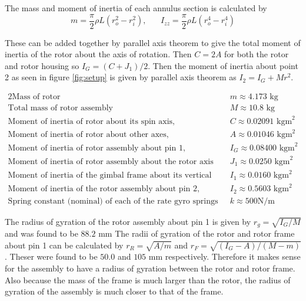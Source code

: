 \documentclass[8pt]{article}
\begin{document}
The mass and moment of inertia of each annulus section is calculated by
\begin{equation}
    m = \frac{\pi}{2} \rho L(r_o^2 - r_i^2), \;\;\;\;\;\; I_{zz} = \frac{\pi}{2} \rho L(r_o^4 - r_i^4)
\end{equation}

These can be added together by parallel axis theorem to give the total moment of inertia of the rotor about the axis of rotation.
Then $C = 2A$ for both the rotor and rotor housing so $I_G = (C + J_1)/2$.
Then the moment of inertia about point 2 as seen in figure \ref{fig:setup} is given by parallel axis theorem as $I_2 = I_G + Mr^2$.

\begin{alignat}{2}
    \text{Mass of rotor} \;\;\;\; & m \approx 4.173 \text{ kg} \nonumber\\
    \text{Total mass of rotor assembly} \;\;\;\; & M \approx 10.8 \text{ kg} \nonumber\\
    \text{Moment of inertia of rotor about its spin axis,} \;\;\;\; &  C \approx 0.02091 \text{ kgm}^2 \nonumber \\
    \text{Moment of inertia of rotor about other axes,} \;\;\;\; &  A \approx 0.01046 \text{ kgm}^2 \nonumber \\
    \text{Moment of inertia of rotor assembly about pin 1,} \;\;\;\; & I_G \approx 0.08400 \text{ kgm}^2 \nonumber \\
    \text{Moment of inertia of rotor assembly about the rotor axis (excluding rotor)} \;\;\;\; &  J_1 \approx 0.0250 \text{ kgm}^2 \nonumber \\
    \text{Moment of inertia of the gimbal frame about its vertical axis of rotation,} \;\;\;\; &  I_1 \approx 0.0160 \text{ kgm}^2 \nonumber \\
    \text{Moment of inertia of the rotor assembly about pin 2,} \;\;\;\; &  I_2 \approx 0.5603 \text{ kgm}^2 \nonumber \\
    \text{Spring constant (nominal) of each of the rate gyro springs} \;\;\;\; & k \approx 500 \text{N/m} \nonumber
\end{alignat}

The radius of gyration of the rotor assembly about pin 1 is given by $r_g = \sqrt{I_G/M}$ and was found to be $88.2$ mm
The radii of gyration of the rotor and rotor frame about pin 1 can be calculated by $r_R = \sqrt{A/m}$ and $r_F = \sqrt{(I_G - A)/(M-m)}$.
Theser were found to be $50.0$ and $105$ mm respectively.
Therefore it makes sense for the assembly to have a radius of gyration between the rotor and rotor frame.
Also because the mass of the frame is much larger than the rotor, the radius of gyration of the assembly is much closer to that of the frame.
\end{document}
